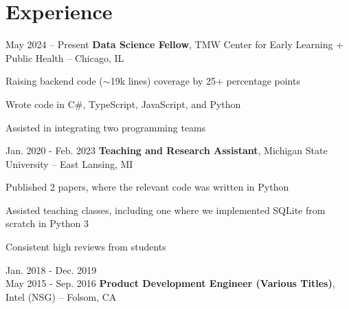 

	\vspace{-0.1 cm}

	\section{Experience}

	\begin{twocolentry}
		{ May 2024 – Present } \textbf{Data Science Fellow}, TMW Center for Early Learning
		+ Public Health -- Chicago, IL
	\end{twocolentry}

	\vspace{0.10 cm}
	\begin{onecolentry}
		\begin{highlights}
			\item Raising backend code ($\sim$19k lines) coverage by 25+ percentage points
			\item Wrote code in C\#, TypeScript, JavaScript, and Python
			\item Assisted in integrating two programming teams
		\end{highlights}
	\end{onecolentry}

	\vspace{0.2 cm}

	\begin{twocolentry}
		{ Jan. 2020 - Feb. 2023 } \textbf{Teaching and Research Assistant}, Michigan
		State University -- East Lansing, MI
	\end{twocolentry}

	\vspace{0.10 cm}
	\begin{onecolentry}
		\begin{highlights}
			\item Published 2 papers, where the relevant code was written in Python
			\item Assisted teaching classes, including one where we implemented SQLite
			from scratch in Python 3 \item Consistent high reviews from students
		\end{highlights}
	\end{onecolentry}

	\vspace{0.2 cm}

	\begin{twocolentry}
		{ Jan. 2018 - Dec. 2019 \\ May 2015 - Sep. 2016 } \textbf{Product
		Development Engineer (Various Titles)}, Intel (NSG) -- Folsom, CA
	\end{twocolentry}

